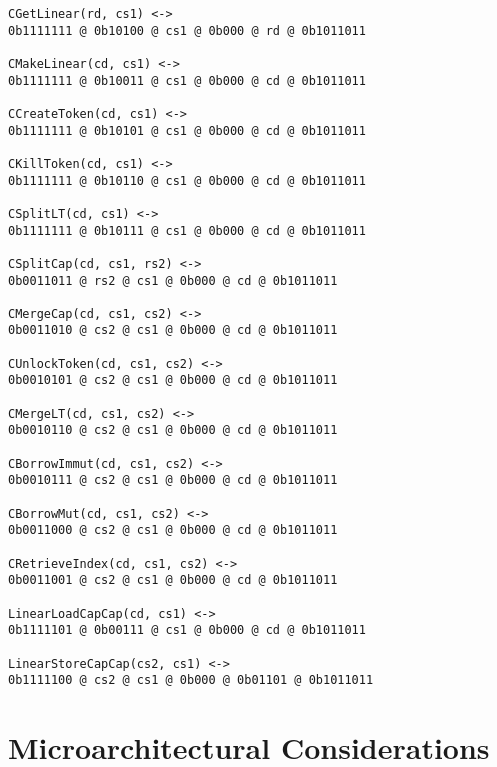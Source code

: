 \begin{verbatim}
CGetLinear(rd, cs1) <->
0b1111111 @ 0b10100 @ cs1 @ 0b000 @ rd @ 0b1011011

CMakeLinear(cd, cs1) <->
0b1111111 @ 0b10011 @ cs1 @ 0b000 @ cd @ 0b1011011

CCreateToken(cd, cs1) <->
0b1111111 @ 0b10101 @ cs1 @ 0b000 @ cd @ 0b1011011

CKillToken(cd, cs1) <->
0b1111111 @ 0b10110 @ cs1 @ 0b000 @ cd @ 0b1011011

CSplitLT(cd, cs1) <->
0b1111111 @ 0b10111 @ cs1 @ 0b000 @ cd @ 0b1011011

CSplitCap(cd, cs1, rs2) <->
0b0011011 @ rs2 @ cs1 @ 0b000 @ cd @ 0b1011011

CMergeCap(cd, cs1, cs2) <->
0b0011010 @ cs2 @ cs1 @ 0b000 @ cd @ 0b1011011

CUnlockToken(cd, cs1, cs2) <->
0b0010101 @ cs2 @ cs1 @ 0b000 @ cd @ 0b1011011

CMergeLT(cd, cs1, cs2) <->
0b0010110 @ cs2 @ cs1 @ 0b000 @ cd @ 0b1011011

CBorrowImmut(cd, cs1, cs2) <->
0b0010111 @ cs2 @ cs1 @ 0b000 @ cd @ 0b1011011

CBorrowMut(cd, cs1, cs2) <->
0b0011000 @ cs2 @ cs1 @ 0b000 @ cd @ 0b1011011

CRetrieveIndex(cd, cs1, cs2) <->
0b0011001 @ cs2 @ cs1 @ 0b000 @ cd @ 0b1011011

LinearLoadCapCap(cd, cs1) <->
0b1111101 @ 0b00111 @ cs1 @ 0b000 @ cd @ 0b1011011

LinearStoreCapCap(cs2, cs1) <->
0b1111100 @ cs2 @ cs1 @ 0b000 @ 0b01101 @ 0b1011011

\end{verbatim}

\section{Microarchitectural Considerations}
